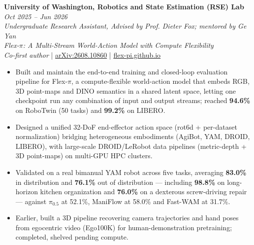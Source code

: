 \documentclass[a4paper,10pt]{article}
\begin{document}
\textbf{University of Washington, Robotics and State Estimation (RSE) Lab} \hfill \textit{Oct 2025 -- Jun 2026} \\
\textit{Undergraduate Research Assistant, Advised by Prof. Dieter Fox; mentored by Ge Yan} \\
\textit{Flex-$\pi$: A Multi-Stream World-Action Model with Compute Flexibility} \\
\textit{Co-first author} \hspace{0.2cm}|\hspace{0.2cm} \href{https://arxiv.org/abs/2608.10860}{arXiv:2608.10860} \hspace{0.2cm}|\hspace{0.2cm} \href{https://flex-pi.github.io}{flex-pi.github.io}
\begin{itemize}[noitemsep,leftmargin=*,topsep=2pt]
    \item Built and maintain the end-to-end training and closed-loop evaluation pipeline for Flex-$\pi$, a compute-flexible world-action model that embeds RGB, 3D point-maps and DINO semantics in a shared latent space, letting one checkpoint run any combination of input and output streams; reached \textbf{94.6\%} on RoboTwin (50 tasks) and \textbf{99.2\%} on LIBERO.
    \item Designed a unified 32-DoF end-effector action space (rot6d + per-dataset normalization) bridging heterogeneous embodiments (AgiBot, YAM, DROID, LIBERO), with large-scale DROID/LeRobot data pipelines (metric-depth + 3D point-maps) on multi-GPU HPC clusters.
    \item Validated on a real bimanual YAM robot across five tasks, averaging \textbf{83.0\%} in distribution and \textbf{76.1\%} out of distribution --- including \textbf{98.8\%} on long-horizon kitchen organization and \textbf{76.0\%} on a dexterous screw-driving repair --- against $\pi_{0.5}$ at 52.1\%, ManiFlow at 58.0\% and Fast-WAM at 31.7\%.
    \item Earlier, built a 3D pipeline recovering camera trajectories and hand poses from egocentric video (Ego100K) for human-demonstration pretraining; completed, shelved pending compute.
\end{itemize}
\end{document}
